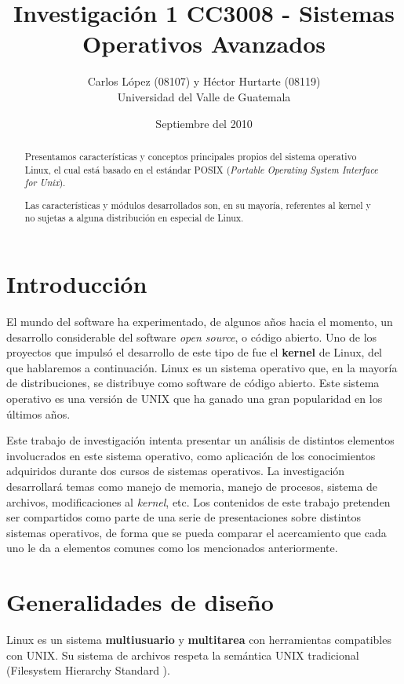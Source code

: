 \documentclass[spanish]{article}
\begin{document}
\title{Investigaci\'{o}n 1 \linebreak
CC3008 - Sistemas Operativos Avanzados } 
\author{Carlos López (08107) y Héctor Hurtarte (08119) \\ 
Universidad del Valle de Guatemala}   
\date{Septiembre del 2010}
\maketitle

\tableofcontents

\pagebreak
\begin{abstract}

Presentamos características y conceptos principales propios del sistema operativo Linux, el cual está basado en el estándar POSIX (\textit{Portable Operating System Interface for Unix}).

Las características y módulos desarrollados son, en su mayoría, referentes al kernel y no sujetas a alguna distribución en especial de Linux.
\end{abstract}

\section*{Introducción}
El mundo del software ha experimentado, de algunos años hacia el momento, un desarrollo considerable del software \textit{open source}, o código abierto. Uno de los proyectos que impulsó el desarrollo de este tipo de fue el \textbf{kernel} de Linux, del que hablaremos a continuación. Linux es un sistema operativo que, en la mayoría de distribuciones, se distribuye como software de c\'{o}digo abierto. Este sistema operativo es una versión de UNIX que ha ganado una gran popularidad en los últimos años. 

Este trabajo de investigación intenta presentar un análisis de distintos elementos involucrados en este sistema operativo, como aplicación de los conocimientos adquiridos durante dos cursos de sistemas operativos. La investigación desarrollará temas como manejo de memoria, manejo de procesos, sistema de archivos, modificaciones al \textit{kernel}, etc. Los contenidos de este trabajo pretenden ser compartidos como parte de una serie de presentaciones sobre distintos sistemas operativos, de forma que se pueda comparar el acercamiento que cada uno le da a elementos comunes como los mencionados anteriormente.

\section{Generalidades de diseño}
Linux es un sistema \textbf{multiusuario} y \textbf{multitarea} con herramientas compatibles con UNIX. Su sistema de archivos respeta la semántica UNIX tradicional (Filesystem Hierarchy Standard \cite{FHSWikipedia}).
\end{document}
